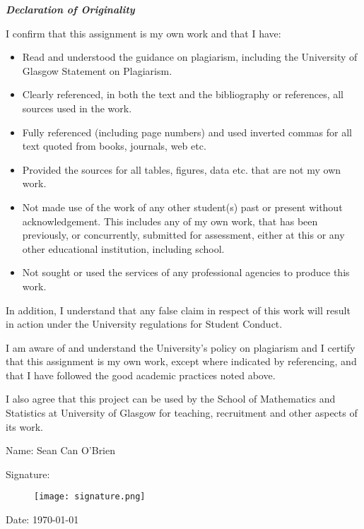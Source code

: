 \documentclass[class=guthesis, crop=false]{standalone}
\begin{document}
\parindent0pt
\parskip=5pt

{\bf \it \large Declaration of Originality}

I confirm that this assignment is my own work and that I have:
\begin{itemize}
\item Read and understood the guidance on plagiarism,
including the University of Glasgow Statement on Plagiarism.

\item Clearly referenced, in both the text and the bibliography or references, all sources used
in the work.

\item Fully referenced (including page numbers) and used inverted commas for all text
quoted from books, journals, web etc.

\item Provided the sources for all tables, figures, data etc. that are not my own work.

\item Not made use of the work of any other student(s) past or present without acknowledgement. This includes any of my own work, that has been previously, or concurrently, submitted for assessment, either at this or any other educational institution,
including school.

\item Not sought or used the services of any professional agencies to produce this work.

\end{itemize}

In addition, I understand that any false claim in respect of this work will result in
action under the University regulations for Student Conduct.

I am aware of and understand the University's policy on plagiarism and I certify that
this assignment is my own work, except where indicated by referencing, and that I
have followed the good academic practices noted above.

I also agree that this project can be used by the School of Mathematics and Statistics at
University of Glasgow for teaching, recruitment and other aspects of its work.

Name: Sean Can O'Brien

Signature: 
\begin{figure}[h]
	\centering
		{\texttt{[image: signature.png]}}
\end{figure}

Date: \today
\end{document}
